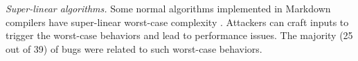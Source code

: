  \emph{Super-linear algorithms.}
Some normal algorithms implemented in Markdown compilers have super-linear worst-case complexity \cite{slowfuzz, perffuzz}.
%
Attackers can craft inputs to trigger the worst-case behaviors and lead to performance issues.
%
%
The majority (25 out of 39) of bugs were related to such worst-case behaviors.
%
%
%
%
%
%
%
%
%
%
%
%
%
%

